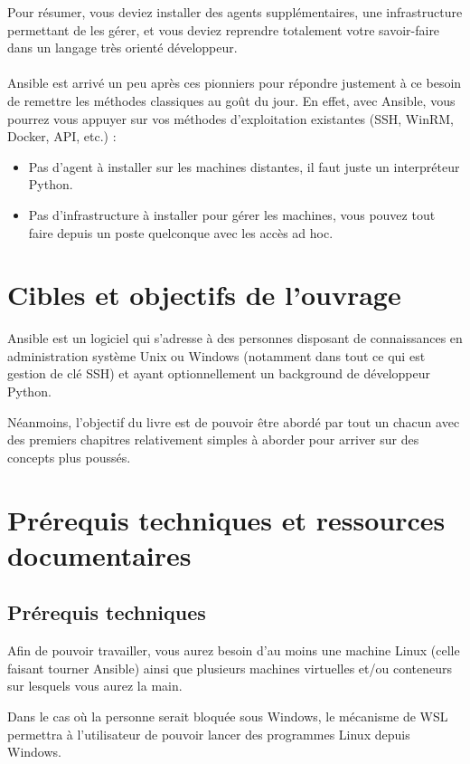 \documentclass[hidelinks]{article}
\begin{document}
Pour résumer, vous deviez installer des agents supplémentaires, une infrastructure permettant de les gérer, et vous deviez reprendre totalement votre savoir-faire dans un langage très orienté développeur.

\paragraph{}
Ansible est arrivé un peu après ces pionniers pour répondre justement à ce besoin de remettre les méthodes classiques au goût du jour. En effet, avec Ansible, vous pourrez vous appuyer sur vos méthodes d'exploitation existantes (SSH, WinRM, Docker, API, etc.) :
\begin{itemize}
    \item Pas d'agent à installer sur les machines distantes, il faut juste un interpréteur Python.
    \item Pas d'infrastructure à installer pour gérer les machines, vous pouvez tout faire depuis un poste quelconque avec les accès ad hoc.
\end{itemize}

\section{Cibles et objectifs de l'ouvrage}
Ansible est un logiciel qui s'adresse à des personnes disposant de connaissances en administration système Unix ou Windows (notamment dans tout ce qui est gestion de clé SSH) et ayant optionnellement un background de développeur Python.

Néanmoins, l'objectif du livre est de pouvoir être abordé par tout un chacun avec des premiers chapitres relativement simples à aborder pour arriver sur des concepts plus poussés.

\section{Prérequis techniques et ressources documentaires}

\subsection{Prérequis techniques}
Afin de pouvoir travailler, vous aurez besoin d'au moins une machine Linux (celle faisant tourner Ansible) ainsi que plusieurs machines virtuelles et/ou conteneurs sur lesquels vous aurez la main.

Dans le cas où la personne serait bloquée sous Windows, le mécanisme de WSL permettra à l'utilisateur de pouvoir lancer des programmes Linux depuis Windows.
\end{document}
